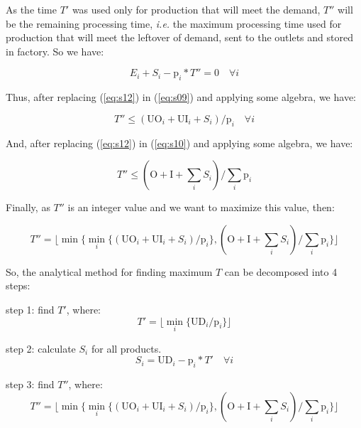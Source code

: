 \documentclass[10pt,fleqn,a4paper,twoside]{article}
\begin{document}
As the time $T'$ was used only for production that will meet the demand, $T''$  will be the remaining processing time, \emph{i.e.} the maximum processing time used for production that will meet the leftover of demand, sent to the outlets and stored in factory. So we have:

\begin{equation}
\label{eq:s12}
E_i + S_i - \textrm{p}_i * T''  = 0 \quad \forall i
\end{equation}

\noindent Thus, after replacing (\ref{eq:s12}) in (\ref{eq:s09}) and applying some algebra, we have:

\begin{equation}
\label{eq:s13}
T''  \leq (\textrm{UO}_i + \textrm{UI}_i + S_i) / \textrm{p}_i \quad \forall i
\end{equation}

\noindent And, after replacing (\ref{eq:s12}) in (\ref{eq:s10}) and applying some algebra, we have:

\begin{equation}
\label{eq:s14}
 T'' \leq (\textrm{O} + \textrm{I} + \sum_i S_i) / \sum_i \textrm{p}_i
\end{equation}

Finally, as $T''$  is an integer value and we want to maximize this value, then:

\begin{equation}
\label{eq:s15}
 T'' = \lfloor\min\{\min_i\{ (\textrm{UO}_i + \textrm{UI}_i + S_i) / \textrm{p}_i\}, (\textrm{O} + \textrm{I} + \sum_i S_i) / \sum_i \textrm{p}_i \}\rfloor
\end{equation}

So, the analytical method for finding maximum $T$ can be decomposed into 4 steps:

step 1: find $T'$, where:
\begin{equation}
T' = \lfloor{\min_{i} \{\textrm{UD}_i / \textrm{p}_i\}}\rfloor
\end{equation}

step 2: calculate $S_i$ for all products.
\begin{equation}
\label{eq:unmet}
S_i = \textrm{UD}_i - \textrm{p}_i * T' \quad \forall i
\end{equation}

step 3: find $T''$, where:
\begin{equation}
T'' = \lfloor{\min \{\min_{i} \{(\textrm{UO}_i + \textrm{UI}_i + S_i) / \textrm{p}_i\},(\textrm{O} + \textrm{I} + \sum_i {S_i}) / \sum_i {\textrm{p}_i}\}}\rfloor
\end{equation}
\end{document}
